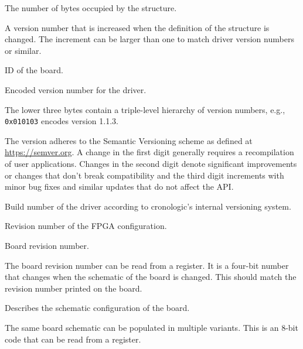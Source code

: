 \begin{description}[style=nextline]
    \item[\cronvar{int}{size}]
    The number of bytes occupied by the structure.

    \item[\cronvar{int}{version}]
    A version number that is increased when the definition of the structure is
    changed. The increment can be larger than one to match driver version
    numbers or similar.

    \item[\cronvar{int}{board\tu id}]
    ID of the board.\par

    \item[\cronvar{int}{driver\tu revision}]
    Encoded version number for the driver.\par
    The lower three bytes contain a triple-level hierarchy of version numbers,
    e.g., \texttt{0x010103} encodes version 1.1.3.\par
    The version adheres to the Semantic Versioning scheme as defined at
    \href{https://semver.org}{https://semver.org}. A change in the first digit
    generally requires a recompilation of user applications.  Changes in the
    second digit denote significant improvements or changes that don't break
    compatibility and the third digit increments with minor bug fixes and
    similar updates that do not affect the API.

    \item[\cronvar{int}{driver\tu build\tu revision}]
    Build number of the driver according to cronologic's internal versioning
    system.

    \item[\cronvar{int}{firmware\tu revision}]
    Revision number of the FPGA configuration.

    \item[\cronvar{int}{board\tu revision}]
    Board revision number.\par
    The board revision number can be read from a register. It is a four-bit
    number that changes when the schematic of the board is changed. This should
    match the revision number printed on the board.

    \item[\cronvar{int}{board\tu configuration}]
    Describes the schematic configuration of the board.\par
    The same board schematic can be populated in multiple variants. This is an
    8-bit code that can be read from a register.


\end{description}
